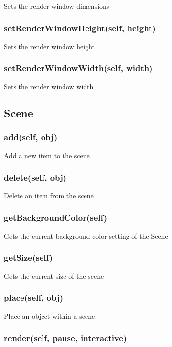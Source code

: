Sets the render window dimensions

\subsubsection{setRenderWindowHeight(self, height)}

Sets the render window height

\subsubsection{setRenderWindowWidth(self, width)}

Sets the render window width

\subsection{Scene}

\subsubsection{add(self, obj)}

Add a new item to the scene

\subsubsection{delete(self, obj)}

Delete an item from the scene

\subsubsection{getBackgroundColor(self)}

Gets the current background color setting of the Scene

\subsubsection{getSize(self)}

Gets the current size of the scene

\subsubsection{place(self, obj)}

Place an object within a scene

\subsubsection{render(self, pause, interactive)}

